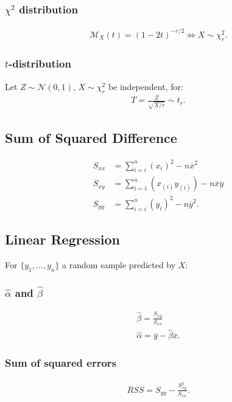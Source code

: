 \documentclass[a4paper, 12pt, twoside]{article}
\begin{document}
\subsubsection{$\chi^2$ distribution}
\begin{gather*}
    \mathcal{M}_X(t) = (1 - 2t)^{-r / 2} \Longleftrightarrow
    X \sim \chi^2_r.
\end{gather*}

\subsubsection{$t$-distribution}
Let $Z \sim \mathcal{N}(0, 1)$, $X \sim \chi_r^2$ be independent, for:
\begin{gather*}
    T = \frac{Z}{\sqrt{X / r}} \sim t_r.
\end{gather*}

\subsection{Sum of Squared Difference}
\begin{align*}
    S_{xx} & = \sum_{i=i}^n (x_i)^2 - n\overline{x}^2                     \\
    S_{xy} & = \sum_{i=1}^n (x_{(i)} y_{(i)}) - n\overline{x}\overline{y} \\
    S_{yy} & = \sum_{i=i}^n (y_i)^2 - n\overline{y}^2.
\end{align*}

\subsection{Linear Regression}
For $\{y_1, \ldots, y_n\}$ a random sample predicted by $X$:

\subsubsection{$\hat\alpha$ and $\hat\beta$}
\begin{gather*}
    \hat\beta = \frac{S_{xy}}{S_{xx}} \\
    \hat\alpha = \overline{y} - \hat\beta\overline{x}.
\end{gather*}

\subsubsection{Sum of squared errors}
\begin{gather*}
    RSS = S_{yy} - \frac{S_{xy}^2}{S_{xx}}.
\end{gather*}
\end{document}
